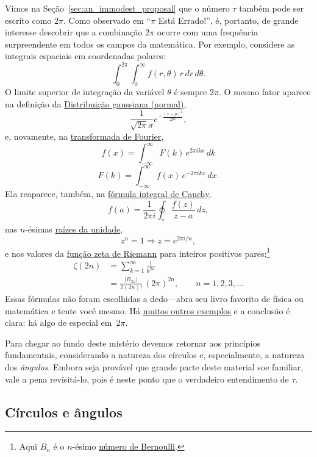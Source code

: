 Vimos na Seção~\ref{sec:an_immodest_proposal} que o número $\tau$ também pode ser escrito como $2\pi$. Como observado em ``$\pi$ Está Errado!'', é, portanto, de grande interesse descobrir que a combinação $2\pi$ ocorre com uma frequência surpreendente em todos os campos da matemática. Por exemplo, considere as integrais espaciais em coordenadas polares:
\[
  \int_0^{2\pi}\int_0^\infty f(r, \theta)\, r\, dr\, d\theta.
\]
O limite superior de integração da variável $\theta$ é sempre $2\pi$. O mesmo fator aparece na definição da \href{https://pt.wikipedia.org/wiki/Distribui%C3%A7%C3%A3o_normal}{Distribuição gaussiana (normal)},
\[
  \frac{1}{\sqrt{2\pi}\sigma}e^{-\frac{(x-\mu)^2}{2\sigma^2}},
\]
e, novamente, na \href{https://mathworld.wolfram.com/FourierTransform.html}{transformada de Fourier},
\[
  f(x) = \int_{-\infty}^\infty F(k)\, e^{2\pi ikx}\,dk
\]
\[
    F(k) = \int_{-\infty}^\infty f(x)\, e^{-2\pi ikx}\,dx.
\]
Ela reaparece, também, na \href{https://pt.wikipedia.org/wiki/F%C3%B3rmula_integral_de_Cauchy}{fórmula integral de Cauchy},
\[
  f(a) = \frac{1}{2\pi i}\oint_\gamma\frac{f(z)}{z-a}\,dz,
\]
nas $n$-ésimas \href{https://pt.wikipedia.org/wiki/Raiz_da_unidade}{raízes da unidade},
\[
  z^n = 1 \Rightarrow z = e^{2\pi i/n},
\]
e nos valores da \href{https://pt.wikipedia.org/wiki/Fun%C3%A7%C3%A3o_zeta_de_Riemann}{função zeta de Riemann} para inteiros positivos pares:\footnote{Aqui $B_n$ é o $n$-ésimo \href{https://pt.wikipedia.org/wiki/N%C3%BAmeros_de_Bernoulli}{número de Bernoulli}.}
\[
\begin{split}
  \zeta(2n) & = \sum_{k=1}^\infty \frac{1}{k^{2n}} \\
            & = \frac{|B_{2n}|}{2(2n)!}\,(2\pi)^{2n},\qquad n = 1, 2, 3, \ldots
\end{split}
\]
Essas fórmulas não foram escolhidas a dedo---abra seu livro favorito de física ou matemática e tente você mesmo. Há \href{http://www.harremoes.dk/Peter/Undervis/Turnpage/Turnpage1.html}{muitos outros exemplos} e a conclusão é clara: há algo de especial em~$2\pi$.

Para chegar ao fundo deste mistério devemos retornar aos princípios fundamentais, considerando a natureza dos círculos e, especialmente, a natureza dos \emph{ângulos}. Embora seja provável que grande parte deste material soe familiar, vale a pena revisitá-lo, pois é neste ponto que o verdadeiro entendimento de $\tau$.

  \subsection{Círculos e ângulos} %
  \label{sec:circles_and_angles}

